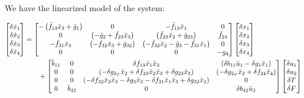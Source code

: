 We have the linearized model of the system:

\begin{align*}
    \begin{bmatrix} \delta \dot x_1 \\ \delta \dot x_2 \\ \delta \dot x_3 \\ \delta \dot x_4 \end{bmatrix} &= \begin{bmatrix} -\left(  \bar f_{13} \bar x_3 + \bar g_1  \right) &
                    0 &
                    -\bar f_{13} \bar x_1 &
                    0 \\
                    0 &
                    \left(  -\bar g_2 + \bar f_{23} \bar x_3  \right)&
                    \left( \bar f_{23} \bar x_2 + \bar g_{23} \right)&
                    \bar f_{24} \\
                    -\bar f_{31} \bar x_3 &
                    \left( -\bar f_{32} \bar x_3 + \bar g_{32}  \right) &
                    \left( -\bar f_{32} \bar x_2 - \bar g_3 - \bar f_{31} \bar x_1  \right) &
                    0 \\
                    0 & 0 & 0 & -g_4
                     \end{bmatrix}
    \begin{bmatrix} \delta x_1 \\ \delta x_2 \\ \delta x_3 \\ \delta x_4 \end{bmatrix}\\
            &\qquad+ \begin{bmatrix}  \bar b_{11} &
                            0 &
                            \delta f_{13} \bar x_1 \bar x_3 &
                            \left( \delta b_{11} \bar u_1- \delta g_1 \bar x_1 \right)
                            \\
                        0&
                        0 &
                        \left( -\delta g_{2_T} \bar x_2 + \delta f_{23} \bar x_2 \bar x_3 + \delta g_{23} \bar x_3 \right) &
                        \left( -\delta g_{2_F} \bar x_2 + \delta f_{24} \bar x_4  \right)
                        \\
                        0&
                        0&
                        \left( -\delta f_{32} \bar x_2 \bar x_3 - \delta g_3 \bar x_3 - \delta f_{31} \bar x_1 \bar x_3 + \delta g_{32} \bar x_2  \right) &
                        0
                        \\
                        0&
                        \bar b_{42}&
                        0&
                        \delta b_{42} \bar u_2
                         \end{bmatrix}
    \begin{bmatrix} \delta u_1 \\ \delta u_2 \\ \delta T \\ \delta F \end{bmatrix}
\end{align*}
